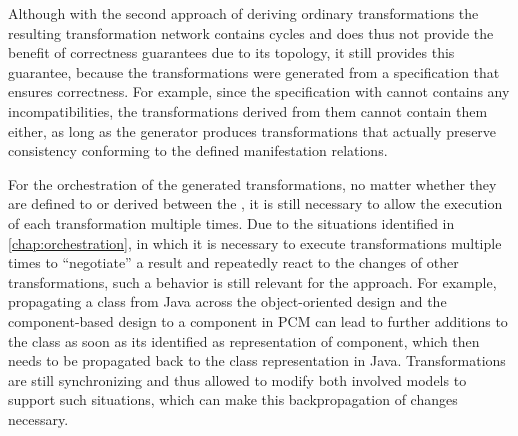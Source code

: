 Although with the second approach of deriving ordinary transformations the resulting transformation network contains cycles and does thus not provide the benefit of correctness guarantees due to its topology, it still provides this guarantee, because the transformations were generated from a specification that ensures correctness.
For example, since the specification with \commonalities cannot contains any incompatibilities, the transformations derived from them cannot contain them either, as long as the generator produces transformations that actually preserve consistency conforming to the defined manifestation relations.

For the orchestration of the generated transformations, no matter whether they are defined to \conceptmetamodels or derived between the \concretemetamodels, it is still necessary to allow the execution of each transformation multiple times.
Due to the situations identified in \autoref{chap:orchestration}, in which it is necessary to execute transformations multiple times to \enquote{negotiate} a result and repeatedly react to the changes of other transformations, such a behavior is still relevant for the \commonalities approach.
For example, propagating a class from Java across the object-oriented design \conceptmetamodels and the component-based design \conceptmetamodel to a component in \gls{PCM} can lead to further additions to the class as soon as its identified as representation of component, which then needs to be propagated back to the class representation in Java.
Transformations are still synchronizing and thus allowed to modify both involved models to support such situations, which can make this backpropagation of changes necessary.




